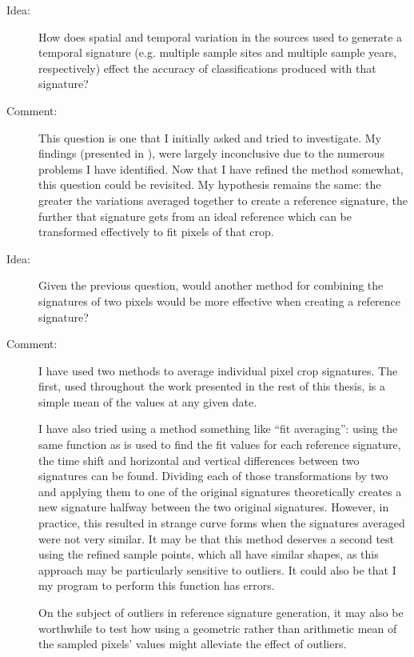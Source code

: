 \begin{description}
\item[Idea:] How does spatial and temporal variation in the sources used to generate a temporal signature (e.g. multiple sample sites and multiple sample years, respectively) effect the accuracy of classifications produced with that signature?

\item[Comment:] This question is one that I initially asked and tried to investigate. My findings (presented in 
), were largely inconclusive due to the numerous problems I have identified. Now that I have refined the method somewhat, this question could be revisited. My hypothesis remains the same: the greater the variations averaged together to create a reference signature, the further that signature gets from an ideal reference which can be transformed effectively to fit pixels of that crop.

\item[Idea:] Given the previous question, would another method for combining the signatures of two pixels would be more effective when creating a reference signature?

\item[Comment:] I have used two methods to average individual pixel crop signatures. The first, used throughout the work presented in the rest of this thesis, is a simple mean of the values at any given date.

I have also tried using a method something like “fit averaging”: using the same function as is used to find the fit values for each reference signature, the time shift and horizontal and vertical differences between two signatures can be found. Dividing each of those transformations by two and applying them to one of the original signatures theoretically creates a new signature halfway between the two original signatures. However, in practice, this resulted in strange curve forms when the signatures averaged were not very similar. It may be that this method deserves a second test using the refined sample points, which all have similar shapes, as this approach may be particularly sensitive to outliers. It could also be that I my program to perform this function has errors.

On the subject of outliers in reference signature generation, it may also be worthwhile to test how using a geometric rather than arithmetic mean of the sampled pixels’ values might alleviate the effect of outliers.
\end{description}

